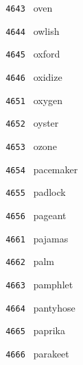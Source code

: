 \documentclass[11pt]{article}
\begin{document}
\begin{multicols}{6}
\noindent \texttt{ 4643 } \hspace{1mm} oven  \par
\noindent \texttt{ 4644 } \hspace{1mm} owlish  \par
\noindent \texttt{ 4645 } \hspace{1mm} oxford  \par
\noindent \texttt{ 4646 } \hspace{1mm} oxidize  \par
\noindent \texttt{ 4651 } \hspace{1mm} oxygen  \par
\noindent \texttt{ 4652 } \hspace{1mm} oyster  \par
\noindent \texttt{ 4653 } \hspace{1mm} ozone  \par
\noindent \texttt{ 4654 } \hspace{1mm} pacemaker  \par
\noindent \texttt{ 4655 } \hspace{1mm} padlock  \par
\noindent \texttt{ 4656 } \hspace{1mm} pageant  \par
\noindent \texttt{ 4661 } \hspace{1mm} pajamas  \par
\noindent \texttt{ 4662 } \hspace{1mm} palm  \par
\noindent \texttt{ 4663 } \hspace{1mm} pamphlet  \par
\noindent \texttt{ 4664 } \hspace{1mm} pantyhose  \par
\noindent \texttt{ 4665 } \hspace{1mm} paprika  \par
\noindent \texttt{ 4666 } \hspace{1mm} parakeet  \par
\end{multicols}
\end{document}
